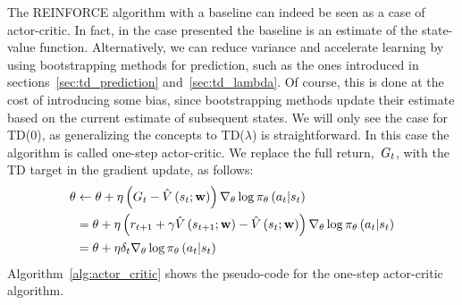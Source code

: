 The REINFORCE algorithm with a baseline can indeed be seen as a case of actor-critic. In fact, in the case presented the baseline is an estimate of the state-value function. Alternatively, we can reduce variance and accelerate learning by using bootstrapping methods for prediction, such as the ones introduced in sections~\ref{sec:td_prediction} and~\ref{sec:td_lambda}. Of course, this is done at the cost of introducing some bias, since bootstrapping methods update their estimate based on the current estimate of subsequent states. We will only see the case for TD(0), as generalizing the concepts to TD(${\lambda}$) is straightforward. In this case the algorithm is called one-step actor-critic. We replace the full return,~${G_{t}}$, with the TD target in the gradient update, as follows:
\begin{align}
	\theta
		&\gets\theta+\eta\left(G_{t}-\hat{V}\left(s_{t};\mathbf{w}\right)\right)\nabla_{\theta}\log\pi_{\theta}\left(a_{t}\middle\vert s_{t}\right) \notag \\
		&=\theta+\eta\left(r_{t+1}+\gamma\hat{V}\left(s_{t+1};\mathbf{w}\right)-\hat{V}\left(s_{t};\mathbf{w}\right)\right)\nabla_{\theta}\log\pi_{\theta}\left(a_{t}\middle\vert s_{t}\right) \notag \\
		&=\theta+\eta\delta_{t}\nabla_{\theta}\log\pi_{\theta}\left(a_{t}\middle\vert s_{t}\right)
\end{align}
Algorithm~\ref{alg:actor_critic} shows the pseudo-code for the one-step actor-critic algorithm.
